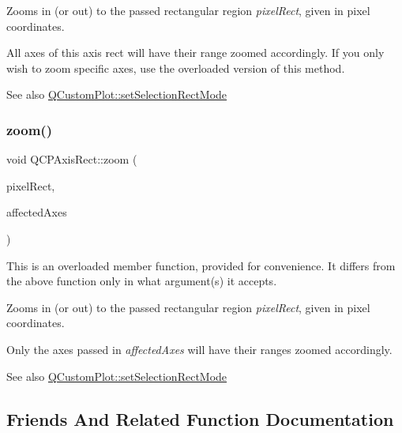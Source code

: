 Zooms in (or out) to the passed rectangular region {\itshape pixel\+Rect}, given in pixel coordinates.

All axes of this axis rect will have their range zoomed accordingly. If you only wish to zoom specific axes, use the overloaded version of this method.

\begin{DoxySeeAlso}{See also}
\mbox{\hyperlink{class_q_custom_plot_a810ef958ebe84db661c7288b526c0deb}{Q\+Custom\+Plot\+::set\+Selection\+Rect\+Mode}} 
\end{DoxySeeAlso}
\mbox{\label{class_q_c_p_axis_rect_ae481c28b50e10cfbbec59fde45e77367}} 
\subsubsection{\texorpdfstring{zoom()}{zoom()}\hspace{0.1cm}{\footnotesize\ttfamily [2/2]}}
{\footnotesize\ttfamily void Q\+C\+P\+Axis\+Rect\+::zoom (\begin{DoxyParamCaption}\item[{const Q\+RectF \&}]{pixel\+Rect,  }\item[{const Q\+List$<$ \mbox{\hyperlink{class_q_c_p_axis}{Q\+C\+P\+Axis}} $\ast$ $>$ \&}]{affected\+Axes }\end{DoxyParamCaption})}

This is an overloaded member function, provided for convenience. It differs from the above function only in what argument(s) it accepts.

Zooms in (or out) to the passed rectangular region {\itshape pixel\+Rect}, given in pixel coordinates.

Only the axes passed in {\itshape affected\+Axes} will have their ranges zoomed accordingly.

\begin{DoxySeeAlso}{See also}
\mbox{\hyperlink{class_q_custom_plot_a810ef958ebe84db661c7288b526c0deb}{Q\+Custom\+Plot\+::set\+Selection\+Rect\+Mode}} 
\end{DoxySeeAlso}


\subsection{Friends And Related Function Documentation}
\mbox{\label{class_q_c_p_axis_rect_a1cdf9df76adcfae45261690aa0ca2198}} 

